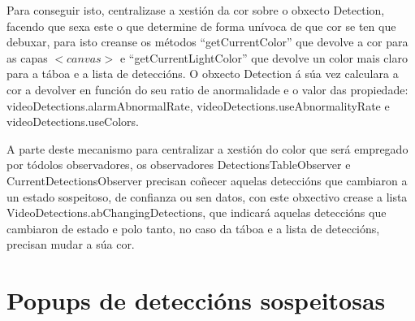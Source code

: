     Para conseguir isto, centralizase a xestión da cor sobre o obxecto Detection, facendo que sexa 
    este o que determine de forma unívoca de que cor se ten que debuxar, para isto creanse os 
    métodos ``getCurrentColor'' que devolve a cor para as capas $<canvas>$ e 
    ``getCurrentLightColor'' que devolve un color mais claro para a táboa e a lista de deteccións.
    O obxecto Detection á súa vez calculara a cor a devolver en función do seu ratio de anormalidade
    e o valor das propiedade: videoDetections.alarmAbnormalRate, videoDetections.useAbnormalityRate
    e videoDetections.useColors.
    
    A parte deste mecanismo para centralizar a xestión do color que será empregado por tódolos 
    observadores, os observadores DetectionsTableObserver e CurrentDetectionsObserver precisan 
    coñecer aquelas deteccións que cambiaron a un estado sospeitoso, de confianza ou sen datos,
    con este obxectivo crease a lista VideoDetections.abChangingDetections, que indicará aquelas
    deteccións que cambiaron de estado e polo tanto, no caso da táboa e a lista de deteccións, 
    precisan mudar a súa cor.
    

\section{Popups de deteccións sospeitosas}


